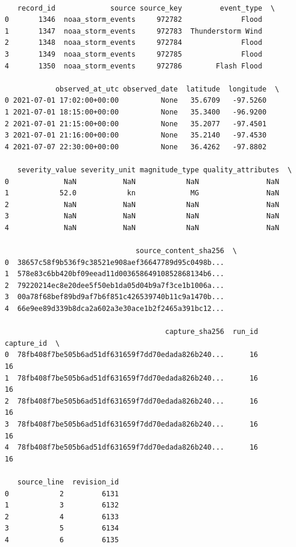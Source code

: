 {\scriptsize\begin{verbatim}

   record_id             source source_key         event_type  \
0       1346  noaa_storm_events     972782              Flood   
1       1347  noaa_storm_events     972783  Thunderstorm Wind   
2       1348  noaa_storm_events     972784              Flood   
3       1349  noaa_storm_events     972785              Flood   
4       1350  noaa_storm_events     972786        Flash Flood   

            observed_at_utc observed_date  latitude  longitude  \
0 2021-07-01 17:02:00+00:00          None   35.6709   -97.5260   
1 2021-07-01 18:15:00+00:00          None   35.3400   -96.9200   
2 2021-07-01 21:15:00+00:00          None   35.2077   -97.4501   
3 2021-07-01 21:16:00+00:00          None   35.2140   -97.4530   
4 2021-07-07 22:30:00+00:00          None   36.4262   -97.8802   

   severity_value severity_unit magnitude_type quality_attributes  \
0             NaN           NaN            NaN                NaN   
1            52.0            kn             MG                NaN   
2             NaN           NaN            NaN                NaN   
3             NaN           NaN            NaN                NaN   
4             NaN           NaN            NaN                NaN   

                               source_content_sha256  \
0  38657c58f9b536f9c38521e908aef36647789d95c0498b...   
1  578e83c6bb420bf09eead11d00365864910852868134b6...   
2  79220214ec8e20dee5f50eb1da05d04b9a7f3ce1b1006a...   
3  00a78f68bef89bd9af7b6f851c426539740b11c9a1470b...   
4  66e9ee89d339b8dca2a602a3e30ace1b2f2465a391bc12...   

                                      capture_sha256  run_id  capture_id  \
0  78fb408f7be505b6ad51df631659f7dd70edada826b240...      16          16   
1  78fb408f7be505b6ad51df631659f7dd70edada826b240...      16          16   
2  78fb408f7be505b6ad51df631659f7dd70edada826b240...      16          16   
3  78fb408f7be505b6ad51df631659f7dd70edada826b240...      16          16   
4  78fb408f7be505b6ad51df631659f7dd70edada826b240...      16          16   

   source_line  revision_id  
0            2         6131  
1            3         6132  
2            4         6133  
3            5         6134  
4            6         6135  

\end{verbatim}}


